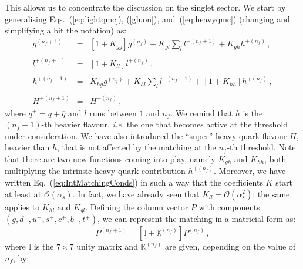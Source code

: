 \documentclass[10pt,a4paper]{article}
\begin{document}
This allows us to concentrate the discussion on the singlet sector. We
start by generalising Eqs.~(\ref{eq:lightqmc}), (\ref{gluon}),
and~(\ref{eq:heavyqmc}) (changing and simplifying a bit the notation)
as:
\begin{equation}\label{eq:IntMatchingConds}
\begin{array}{rcl}
  \displaystyle g^{(n_f+1)}&=&\displaystyle
                               [1+K_{gg}]g^{(n_f)}+K_{gl}\sum_l
                               l^{+(n_f+1)} + K_{gh}h^{+(n_f)}\,,\\
  \\
  \displaystyle l^{+(n_f+1)}&=&\displaystyle [1+K_{ll}]l^{+(n_f)}\,,\\
  \\
  \displaystyle h^{+(n_f+1)}&=&\displaystyle K_{hg}g^{(n_f)} + K_{hl}\sum_l
                                l^{+(n_f+1)}+[1+K_{hh}]h^{+(n_f)}\,,\\
  \\
  H^{+(n_f+1)} &=& H^{+(n_f)}\,,
\end{array}
\end{equation}
where $q^+=q+\overline{q}$ and $l$ runs between $1$ and $n_f$. We
remind that $h$ is the $(n_f+1)$-th heavier flavour, \textit{i.e.}
the one that becomes active at the threshold under consideration. We
have also introduced the ``super'' heavy quark flavour $H$, heavier
than $h$, that is not affected by the matching at the $n_f$-th
threshold. Note that there are two new functions coming into play,
namely $K_{gh}$ and $K_{hh}$, both multiplying the intrinsic
heavy-quark contribution $h^{+(n_f)}$. Moreover, we have written
Eq.~(\ref{eq:IntMatchingConds}) in such a way that the coefficients
$K$ start at least at $\mathcal{O}(\alpha_s)$. In fact, we have
already seen that $K_{ll}=\mathcal{O}(\alpha_s^2)$; the same applies
to $K_{hl}$ and $K_{gl}$. Defining the column vector $P$ with
components $(g,d^+,u^+,s^+,c^+,b^+,t^+)$, we can represent the
matching in a matricial form as:
\begin{equation}
P^{(n_f+1)} = \left[\mathbb{I}+\mathbb{K}^{(n_f)}\right]P^{(n_f)}\,,
\end{equation}
where $\mathbb{I}$ is the $7\times7$ unity matrix and
$\mathbb{K}^{(n_f)}$ are given, depending on the value of $n_f$, by:
\end{document}
